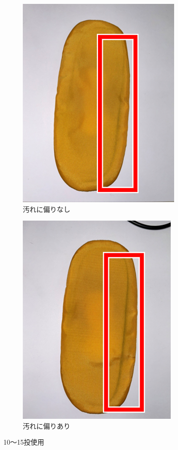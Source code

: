 \documentclass[main]{subfiles}
\begin{document}
\begin{figure}[htbp]
    \centering
    \begin{subfigure}[htbp]{0.3\linewidth}
        \centering
        \includegraphics[keepaspectratio, width=0.8\linewidth, height=\linewidth]{figures/caring_brush_pad/10~15Akousatu.png}
        \caption{汚れに偏りなし}
        \label{fig:labelX}
    \end{subfigure}
    \begin{subfigure}[htbp]{0.3\linewidth}
        \centering
        \includegraphics[keepaspectratio, width=0.8\linewidth, height=\linewidth]{figures/caring_brush_pad/10~15Bkousatu.png}
        \caption{汚れに偏りあり}
        \label{fig:labelY}
    \end{subfigure}
    \caption{10～15投使用}
    \label{fig:label}
\end{figure}
\end{document}
